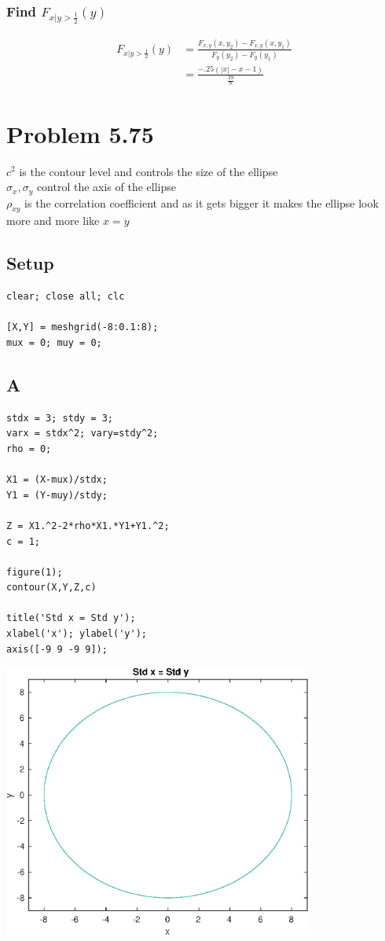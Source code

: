 \documentclass[12pt]{article}
\begin{document}
\subsubsection*{Find $F_{x|y>\frac{1}{2}}(y)$}
\begin{align*}
  F_{x|y>\frac{1}{2}}(y) &= \frac{F_{x,y}(x,y_2)-F_{x,y}(x,y_1)}{F_y(y_2)-F_y(y_1)} \\
  &= \frac{-.25(|x|-x-1)}{\frac{39}{8}}
\end{align*} 

\section*{Problem 5.75}
$c^2$ is the contour level and controls the size of the ellipse \\
$\sigma_x , \sigma_y$ control the axis of the ellipse \\
$\rho_{xy}$ is the correlation coefficient and as it gets bigger it makes the ellipse look
more and more like $x = y$ \\

\subsection*{Setup}

\begin{verbatim}
clear; close all; clc

[X,Y] = meshgrid(-8:0.1:8);
mux = 0; muy = 0;
\end{verbatim}


\subsection*{A}

\begin{verbatim}
stdx = 3; stdy = 3;
varx = stdx^2; vary=stdy^2;
rho = 0;

X1 = (X-mux)/stdx;
Y1 = (Y-muy)/stdy;

Z = X1.^2-2*rho*X1.*Y1+Y1.^2;
c = 1;

figure(1);
contour(X,Y,Z,c)

title('Std x = Std y');
xlabel('x'); ylabel('y');
axis([-9 9 -9 9]);
\end{verbatim}

\includegraphics [width=4in]{prob_5_75_01.eps}
\end{document}
